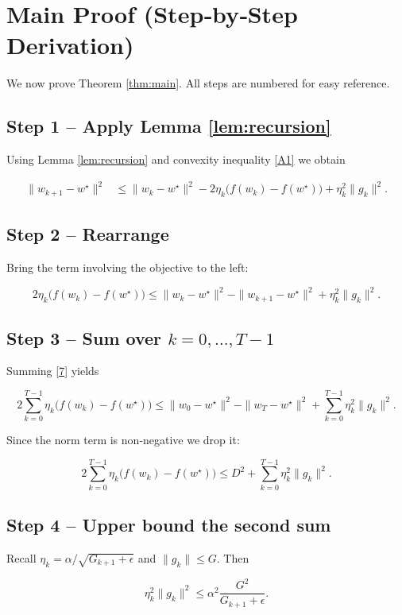 \documentclass{article}
\begin{document}
\section*{Main Proof (Step‑by‑Step Derivation)}
We now prove Theorem \ref{thm:main}.  All steps are numbered for easy reference.

\subsection*{Step 1 – Apply Lemma \ref{lem:recursion}}
Using Lemma \ref{lem:recursion} and convexity inequality \eqref{A1} we obtain

\[
\begin{aligned}
\|w_{k+1}-w^{\star}\|^{2}
&\le \|w_{k}-w^{\star}\|^{2}
-2\eta_{k}\bigl(f(w_{k})-f(w^{\star})\bigr)
+\eta_{k}^{2}\|g_{k}\|^{2}.
\tag{6}
\end{aligned}
\]

\subsection*{Step 2 – Rearrange}
Bring the term involving the objective to the left:

\[
2\eta_{k}\bigl(f(w_{k})-f(w^{\star})\bigr)
\le
\|w_{k}-w^{\star}\|^{2}
-\|w_{k+1}-w^{\star}\|^{2}
+\eta_{k}^{2}\|g_{k}\|^{2}.
\tag{7}
\]

\subsection*{Step 3 – Sum over $k=0,\dots,T-1$}
Summing \eqref{7} yields

\[
2\sum_{k=0}^{T-1}\eta_{k}\bigl(f(w_{k})-f(w^{\star})\bigr)
\le
\|w_{0}-w^{\star}\|^{2}
-\|w_{T}-w^{\star}\|^{2}
+\sum_{k=0}^{T-1}\eta_{k}^{2}\|g_{k}\|^{2}.
\tag{8}
\]

Since the norm term is non‑negative we drop it:

\[
2\sum_{k=0}^{T-1}\eta_{k}\bigl(f(w_{k})-f(w^{\star})\bigr)
\le
D^{2}
+\sum_{k=0}^{T-1}\eta_{k}^{2}\|g_{k}\|^{2}.
\tag{9}
\]

\subsection*{Step 4 – Upper bound the second sum}
Recall \(\eta_{k}= \alpha/\sqrt{G_{k+1}+\epsilon}\) and \(\|g_{k}\|\le G\). Then

\[
\eta_{k}^{2}\|g_{k}\|^{2}
\le
\alpha^{2}\frac{G^{2}}{G_{k+1}+\epsilon}.
\tag{10}
\]
\end{document}
